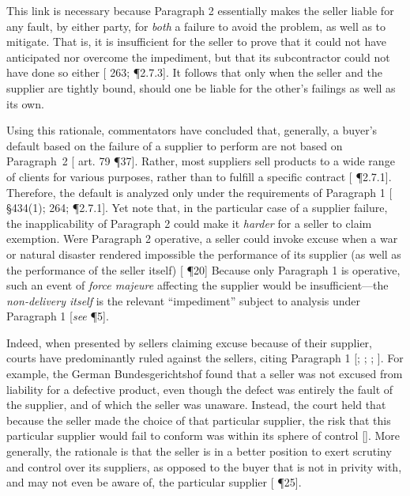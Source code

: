 This link is necessary because Paragraph 2 essentially makes the seller liable for any fault, by either party, for \textit{both} a failure to avoid the problem, as well as to mitigate. That is, it is insufficient for the seller to prove that it could not have anticipated nor overcome the impediment, but that its subcontractor could not have done so either [\cite{Huber Mullis} 263; \cite{Tallon} \P2.7.3]. It follows that only when the seller and the supplier are tightly bound, should one be liable for the other's failings as well as its own. 

Using this rationale, commentators have concluded that, generally, a buyer's default based on the failure of a supplier to perform are not based on Paragraph~2 [\cite{Schwenzer} art. 79 \P37]. Rather, most suppliers sell products to a wide range of clients for various purposes, rather than to fulfill a specific contract [\cite{Tallon} \P2.7.1]. Therefore, the default is analyzed only under the requirements of Paragraph 1 [\cite{Honnold} \S434(1); \cite{Huber Mullis} 264; \cite{Tallon} \P2.7.1]. Yet note that, in the particular case of a supplier failure, the inapplicability of Paragraph 2 could make it \textit{harder} for a seller to claim exemption. Were Paragraph 2 operative, a seller could invoke excuse when a war or natural disaster rendered impossible the performance of its supplier (as well as the performance of the seller itself) [\cite{CISG-AC Op. No. 7} \P20] Because only Paragraph 1 is operative, such an event of \textit{force majeure} affecting the supplier would be insufficient---the \textit{non-delivery itself} is the relevant ``impediment'' subject to analysis under Paragraph 1 [\textit{see} \cite{Metallic Sodium Case} \P5].

Indeed, when presented by sellers claiming excuse because of their supplier, courts have predominantly ruled against the sellers, citing Paragraph 1 [\seeeg \cite{Vine Wax Case}; \cite{Chemical Fertilizer Case}; \cite{Metallic Sodium Case}; \cite{Chinese Goods Case}].  For example, the German Bundesgerichtshof found that a seller was not excused from liability for a defective product, even though the defect was entirely the fault of the supplier, and of which the seller was unaware. Instead, the court held that because the seller made the choice of that particular supplier, the risk that this particular supplier would fail to conform was within its sphere of control [\cite{Vine Wax Case}]. More generally, the rationale is that the seller is in a better position to exert scrutiny and control over its suppliers, as opposed to the buyer that is not in privity with, and may not even be aware of, the particular supplier [\cite{CISG-AC Op. No. 7} \P25]. 

